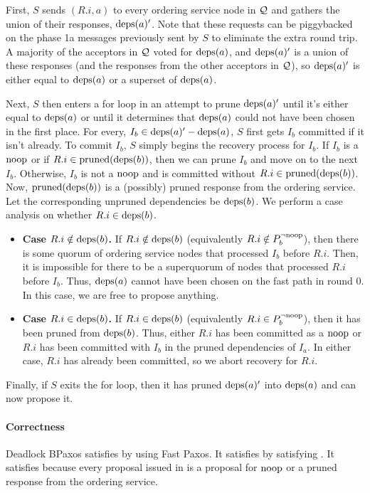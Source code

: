First, $S$ sends $(R.i, a)$ to every ordering service node in $\mathcal{Q}$ and
gathers the union of their responses, $\text{deps}(a)'$. Note that these requests can
be piggybacked on the phase 1a messages previously sent by $S$ to eliminate the
extra round trip. A majority of the acceptors in $\mathcal{Q}$ voted for
$\text{deps}(a)$, and $\text{deps}(a)'$ is a union of these responses (and the responses
from the other acceptors in $\mathcal{Q}$), so $\text{deps}(a)'$ is either equal to
$\text{deps}(a)$ or a superset of $\text{deps}(a)$.

Next, $S$ then enters a for loop in an attempt to prune $\text{deps}(a)'$ until it's
either equal to $\text{deps}(a)$ or until it determines that $\text{deps}(a)$ could not
have been chosen in the first place.
%
For every, $I_b \in \text{deps}(a)' - \text{deps}(a)$, $S$ first gets $I_b$ committed if it
isn't already. To commit $I_b$, $S$ simply begins the recovery process for
$I_b$. If $I_b$ is a $\text{noop}$ or if $R.i \in \text{pruned}(\text{deps}(b))$, then we can
prune $I_b$ and move on to the next $I_b$. Otherwise, $I_b$ is not a $\text{noop}$
and is committed without $R.i \in \text{pruned}(\text{deps}(b))$. Now, $\text{pruned}(\text{deps}(b))$
is a (possibly) pruned response from the ordering service. Let the
corresponding unpruned dependencies be $\text{deps}(b)$. We perform a case analysis
on whether $R.i \in \text{deps}(b)$.
\begin{itemize}
  \item \textbf{Case $R.i \notin \text{deps}(b)$.}
    If $R.i \notin \text{deps}(b)$ (equivalently $R.i \notin P^{\lnot \text{noop}}_{b}$), then
    there is some quorum of ordering service nodes that processed $I_b$ before
    $R.i$. Then, it is impossible for there to be a superquorum of nodes that
    processed $R.i$ before $I_b$. Thus, $\text{deps}(a)$ cannot have been chosen on
    the fast path in round $0$. In this case, we are free to propose anything.

  \item \textbf{Case $R.i \in \text{deps}(b)$.}
    If $R.i \in \text{deps}(b)$ (equivalently $R.i \in P^{\lnot \text{noop}}_{b}$), then it has
    been pruned from $\text{deps}(b)$. Thus, either $R.i$ has been committed as a
    $\text{noop}$ or $R.i$ has been committed with $I_b$ in the pruned dependencies
    of $I_a$. In either case, $R.i$ has already been committed, so we abort
    recovery for $R.i$.
\end{itemize}

Finally, if $S$ exits the for loop, then it has pruned $\text{deps}(a)'$ into
$\text{deps}(a)$ and can now propose it.

\paragraph{Correctness}
Deadlock BPaxos satisfies  by using Fast Paxos. It
satisfies  by satisfying
. It satisfies  because
every proposal issued in  is a proposal for $\text{noop}$ or
a pruned response from the ordering service.

